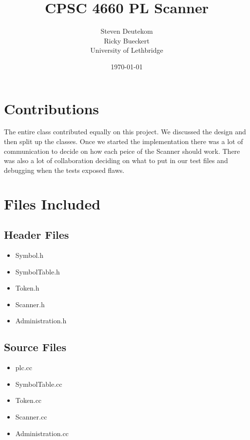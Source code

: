 \documentclass{article}
\begin{document}
\title{CPSC 4660 PL Scanner}
\author{Steven Deutekom\\
        Ricky Bueckert\\
        University of Lethbridge}
\date{\today}

\maketitle


\section{Contributions}
The entire class contributed equally on this project. We discussed the design
and then split up the classes. Once we started the implementation there was a
lot of communication to decide on how each peice of the Scanner should work.
There was also a lot of collaboration deciding on what to put in our test files
and debugging when the tests exposed flaws.

\section{Files Included}
\subsection{Header Files}
\begin{itemize}
  \item Symbol.h
  \item SymbolTable.h
  \item Token.h
  \item Scanner.h
  \item Administration.h
\end{itemize}

\subsection{Source Files}
\begin{itemize}
  \item plc.cc
  \item SymbolTable.cc
  \item Token.cc
  \item Scanner.cc
  \item Administration.cc
\end{itemize}
\end{document}
